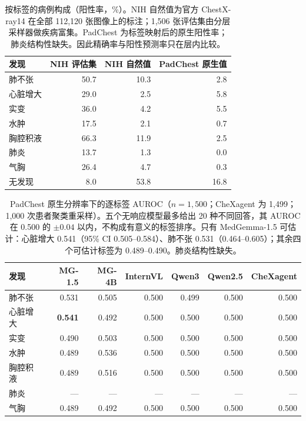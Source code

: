 \begin{table}[H]
\centering
\small
\caption{按标签的病例构成（阳性率，\%）。NIH 自然值为官方 ChestX-ray14 在全部 112,120 张图像上的标注；1,506 张评估集由分层采样器做疾病富集。PadChest 为标签映射后的原生阳性率；肺炎结构性缺失。因此精确率与阳性预测率只在层内比较。}
\label{tab:prevalence}
\begin{tabular}{lrrr}
\toprule
发现 & NIH 评估集 & NIH 自然值 & PadChest 原生值 \\
\midrule
肺不张 & 50.7 & 10.3 & 2.8 \\
心脏增大 & 29.0 & 2.5 & 5.8 \\
实变 & 36.0 & 4.2 & 5.5 \\
水肿 & 17.5 & 2.1 & 0.7 \\
胸腔积液 & 66.3 & 11.9 & 2.5 \\
肺炎 & 13.7 & 1.3 & 0.0 \\
气胸 & 26.4 & 4.7 & 0.3 \\
无发现 & 8.0 & 53.8 & 16.8 \\
\bottomrule
\end{tabular}
\end{table}

\begin{table}[t]
\centering
\footnotesize
\setlength{\tabcolsep}{4pt}
\caption{PadChest 原生分辨率下的逐标签 AUROC（$n=1{,}500$；CheXagent 为 1,499；1,000 次患者聚类重采样）。五个无响应模型最多给出 20 种不同回答，其 AUROC 在 0.500 的 $\pm0.04$ 以内，不构成有意义的标签排序。只有 MedGemma-1.5 可估计：心脏增大 0.541（95\% CI 0.505--0.584）、肺不张 0.531（0.464--0.605）；其余四个可估计标签为 0.489--0.490。肺炎结构性缺失。}
\label{tab:padlabel}
\begin{tabular}{lrrrrrr}
\toprule
发现 & MG-1.5 & MG-4B & InternVL & Qwen3 & Qwen2.5 & CheXagent \\
\midrule
肺不张 & 0.531 & 0.505 & 0.500 & 0.499 & 0.500 & 0.500 \\
心脏增大 & \textbf{0.541} & 0.492 & 0.500 & 0.500 & 0.500 & 0.500 \\
实变 & 0.490 & 0.503 & 0.500 & 0.500 & 0.500 & 0.500 \\
水肿 & 0.489 & 0.536 & 0.500 & 0.500 & 0.500 & 0.500 \\
胸腔积液 & 0.489 & 0.516 & 0.500 & 0.500 & 0.500 & 0.500 \\
肺炎 & --- & --- & --- & --- & --- & --- \\
气胸 & 0.489 & 0.492 & 0.500 & 0.500 & 0.500 & 0.500 \\
\bottomrule
\end{tabular}
\end{table}

